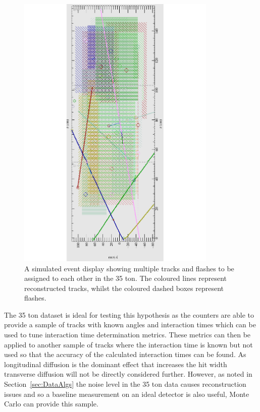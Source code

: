 \begin{figure}[h!]
  \centering
  \includegraphics[width=0.85\textwidth]{LotsOfTrackFlash}
  \caption[A simulated event display showing multiple tracks and flashes in the 35 ton]
          {A simulated event display showing multiple tracks and flashes to be assigned to each other in the 35 ton. The coloured lines represent reconstructed tracks, whilst the coloured dashed boxes represent flashes.}
          \label{fig:DiffLotsOfFlashes}
\end{figure}

The 35 ton dataset is ideal for testing this hypothesis as the counters are able to provide a sample of tracks with known angles and interaction times which can be used to tune interaction time determination metrics. These metrics can then be applied to another sample of tracks where the interaction time is known but not used so that the accuracy of the calculated interaction times can be found. As longitudinal diffusion is the dominant effect that increases the hit width transverse diffusion will not be directly considered further. However, as noted in Section~\ref{sec:DataAlgs} the noise level in the 35 ton data causes reconstruction issues and so a baseline measurement on an ideal detector is also useful, Monte Carlo can provide this sample. \\

